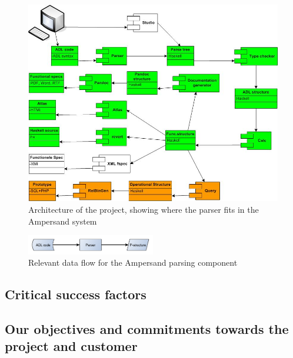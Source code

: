\begin{figure}[h]
  \centering
  \includegraphics[width=\textwidth]{Figures/ADL_systeemarchitectuur}
  \caption[Architecture of the project]{Architecture of the project, showing where the parser fits in the Ampersand system}
  \label{fig:architecture}
\end{figure}

\begin{figure}[h]
  \centering
  \includegraphics[width=0.5\textwidth]{Figures/Architecture}
  \caption{Relevant data flow for the Ampersand parsing component}
  \label{fig:data-flow}
\end{figure}

\subsection{Critical success factors}

\subsection{Our objectives and commitments towards the project and customer}
